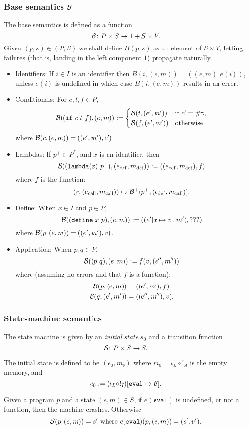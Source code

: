\subsubsection{Base semantics $\B$}

The base semantics is defined as a function
\[
\B \colon P \times S \to 1 + S \times V.
\]
Given $(p,s) \in (P,S)$ we shall define $B(p,s)$ as an element of $S \times V$,
letting failures (that is, landing in the left component $1$) propagate
naturally.
\begin{itemize}
\item Identifiers: If $i \in I$ is an identifier then $B(i,(e,m)) = ((e,m),
  e(i))$, unless $e(i)$ is undefined in which case $B(i, (e,m))$ results in an
  error.
\item Conditionals: For $c,t,f \in P$,
  \[
    \B( (\mathtt{if} \ c \ t \ f), (e,m)) :=
    \begin{cases}
      \B(t, (e', m')) & \text{if $c' = \mathtt{\#t}$,}\\
      \B(f, (e', m')) & \text{otherwise}
    \end{cases}
  \]
  where $\B(c, (e,m)) = ((e',m'), c')$
\item
  \def\defe{\mathrm{def}}
  \def\calle{\mathrm{call}}
  \def\rete{\mathrm{rete}}
  Lambdas: If $p^+ \in P^*$, and $x$ is an identifier, then
  \[
    \B((\mathtt{lambda} (x) \ p^+), (e_\defe,m_\defe)) :=
    ((e_\defe,m_\defe), f)
  \]
  where $f$ is the function:
  \[
    (v, (e_\calle,m_\calle)) \mapsto \B^+(p^+, (e_\defe, m_\calle)).
  \]
\item Define: When $x \in I$ and $p \in P$,
\[
\B((\mathtt{define} \ x \ p), (e,m)) := ((e'[x \mapsto v], m'), ???)
\]
where $\B(p, (e,m)) = ((e', m'), v)$.
\item Application: When $p,q \in P$,
  \[
\B((p \ q), (e,m)) := f(v, (e'',m''))
\]
where (assuming no errors and that $f$ is a function):
\begin{align*}
  \B(p, (e,m)) &= ((e',m'), f)\\
  \B(q, (e',m')) &= ((e'',m''), v).
\end{align*}
\end{itemize}

\subsubsection{State-machine semantics}
The \rad state machine is given by an \emph{initial state} $s_0$ and a
transition function
\[
  \S \colon P \times S \to S.
\]

The initial state is defined to be $(e_0,m_0)$ where $m_0 = \iota_L \circ !_A$
is the empty memory, and
\[
  e_0 := (\iota_L \circ !_I)[\mathtt{eval} \mapsto \B].
\]

Given a program $p$ and a state $(e,m) \in S$,
if $e(\mathtt{eval})$ is undefined, or not a function, then the machine crashes.
Otherwise
\[
  \S(p, (e,m)) = s' \text{ where } e(\mathtt{eval})(p,(e,m)) = (s', v').
\]